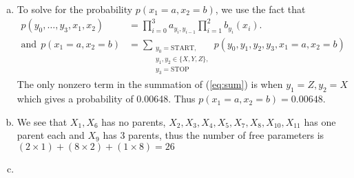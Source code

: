 \documentclass[a4paper,10pt]{article}
\theoremstyle{definition}
\begin{document}
\begin{enumerate}
\begin{enumerate}[(a)]
\item To solve for the probability $p(x_1=a, x_2=b)$, we use the fact that 
\begin{align}
p(y_0,\ldots, y_3,x_1,x_2) &= \prod_{i=0}^{3}a_{y_i,y_{i-1}}\prod_{i=1}^{2}b_{y_i}(x_i)\nonumber.\\ 
\text{and}~~ p(x_1=a, x_2=b) &= \sum_{\substack{y_0=\text{START},\\y_1,y_2 \in \{X,Y,Z\},\\y_3=\text{STOP}}}p(y_0,y_1,y_2, y_3,x_1=a,x_2=b) \label{eq:sum}
\end{align}
The only nonzero term in the summation of (\ref{eq:sum}) is when $y_1=Z, y_2=X$ which gives a probability of 0.00648. Thus $p(x_1=a, x_2=b)=0.00648$.
\item 
We see that $X_1, X_6$ has no parents, $X_2,X_3,X_4,X_5,X_7,X_8,X_{10},X_{11}$ has one parent each and $X_9$ has 3 parents, thus the number of free parameters is $(2 \times 1) + (8\times 2) + (1 \times 8)=26$


\item
\end{enumerate}

\end{enumerate}
\end{document}
